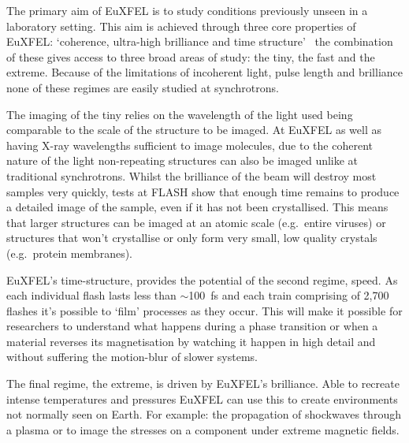 The primary aim of EuXFEL is to study conditions previously unseen in a laboratory setting. This aim is achieved through three core properties of EuXFEL: `coherence, ultra-high brilliance and time structure'~\cite{xfel_tdr} the combination of these gives access to three broad areas of study: the tiny, the fast and the extreme. Because of the limitations of incoherent light, pulse length and brilliance none of these regimes are easily studied at synchrotrons.

The imaging of the tiny relies on the wavelength of the light used being comparable to the scale of the structure to be imaged. At EuXFEL as well as having X-ray wavelengths sufficient to image molecules, due to the coherent nature of the light non-repeating structures can also be imaged unlike at traditional synchrotrons. Whilst the brilliance of the beam will destroy most samples very quickly, tests at FLASH show that enough time remains to produce a detailed image of the sample, even if it has not been crystallised. This means that larger structures can be imaged at an atomic scale (e.g.\ entire viruses) or structures that won't crystallise or only form very small, low quality crystals (e.g.\ protein membranes).

EuXFEL's time-structure, provides the potential of the second regime, speed. As each individual flash lasts less than \( \sim \)100~fs and each train comprising of 2,700 flashes it's possible to `film' processes as they occur. This will make it possible for researchers to understand what happens during a phase transition or when a material reverses its magnetisation by watching it happen in high detail and without suffering the motion-blur of slower systems.

The final regime, the extreme, is driven by EuXFEL's brilliance. Able to recreate intense temperatures and pressures EuXFEL can use this to create environments not normally seen on Earth. For example: the propagation of shockwaves through a plasma or to image the stresses on a component under extreme magnetic fields.
